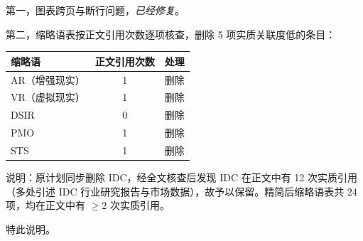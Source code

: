\documentclass[11pt,a4paper]{ctexart}
\begin{document}
第一，图表跨页与断行问题，\emph{已经修复}。

第二，缩略语表按正文引用次数逐项核查，删除 5 项实质关联度低的条目：

\begin{center}
\fontsize{9}{11}\selectfont
\begin{tabular}{lcc}
\toprule
\textbf{缩略语} & \textbf{正文引用次数} & \textbf{处理} \\
\midrule
AR（增强现实） & 1 & 删除 \\
VR（虚拟现实） & 1 & 删除 \\
DSIR           & 0 & 删除 \\
PMO            & 1 & 删除 \\
STS            & 1 & 删除 \\
\bottomrule
\end{tabular}
\end{center}

说明：原计划同步删除 IDC，经全文核查后发现 IDC 在正文中有 12 次实质引用（多处引述 IDC 行业研究报告与市场数据），故予以保留。精简后缩略语表共 24 项，均在正文中有 $\geq 2$ 次实质引用。

\vspace{1em}
\hfill 特此说明。
\end{document}

